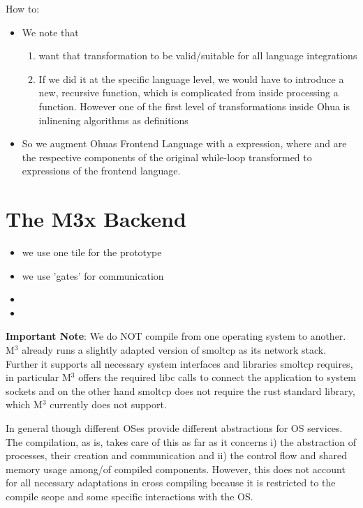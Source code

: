 How to:
\begin{itemize}
    \item We note that 
    \begin{enumerate}
        \item want that transformation to be valid/suitable for all language integrations
        \item If we did it at the specific language level, we would have to introduce a new, recursive function, which is complicated from inside processing a function. However one of the first level of transformations inside Ohua is inlinening algorithms as  definitions  
    \end{enumerate}
    \item So we augment Ohuas Frontend Language with a  expression, where  and  are the respective components of the original while-loop transformed to expressions of the frontend language.
\end{itemize}

\section{The M3x Backend}
\begin{itemize}
    \item we use one tile for the prototype
    \item we use 'gates' for communication
    \item {}
    \item {}
\end{itemize}

\textbf{Important Note}: We do NOT compile from one operating system to another. M$^3$ already runs a slightly adapted version of smoltcp as its network stack. Further it supports all necessary system interfaces and libraries smoltcp requires, in particular M$^3$ offers the required libc calls to connect the application to system sockets and on the other hand smoltcp does not require the rust standard library, which M$^3$ currently does not support. 

In general though different OSes provide different abstractions for OS services. The compilation, as is, takes care of this as far as it concerns i) the abstraction of processes, their creation and communication and ii) the control flow and shared memory usage among/of compiled components. However, this does not account for all necessary adaptations in cross compiling because it is restricted to the compile scope and some specific interactions with the OS. \\
\bigskip

